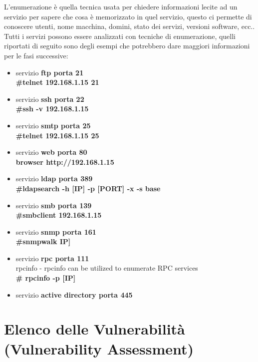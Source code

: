 \documentclass[a4paper,12pt]{article}
\begin{document}
L'enumerazione è quella tecnica usata per chiedere informazioni lecite ad un servizio per sapere che cosa è memorizzato in quel servizio, questo ci permette di conoscere utenti,  nome macchina, domini, stato dei servizi, versioni software, ecc.. \\
Tutti i servizi possono essere analizzati con tecniche di enumerazione, quelli riportati di seguito sono degli esempi che potrebbero dare maggiori informazioni per le fasi successive:
\begin{itemize}

    \item servizio\textbf{ ftp porta 21} \\
        \textbf{ \#telnet  192.168.1.15 21}
    \item servizio \textbf{ssh porta 22} \\
        \textbf{ \#ssh -v 192.168.1.15}
    \item servizio \textbf{smtp porta 25} \\
        \textbf{ \#telnet  192.168.1.15 25}
     \item servizio \textbf{web porta 80} \\
        \textbf{ browser http://192.168.1.15}
    \item servizio \textbf{ldap porta 389} \\
        \textbf{ \#ldapsearch -h [IP] -p [PORT] -x -s base}
    \item servizio\textbf{ smb porta 139} \\
        \textbf{ \#smbclient 192.168.1.15}
    \item servizio\textbf{ snmp porta 161} \\
         \textbf{ \#snmpwalk IP]}
     \item servizio\textbf{ rpc porta 111} \\
        rpcinfo - rpcinfo can be utilized to enumerate RPC services \\
        \textbf{ \# rpcinfo -p [IP]}
    \item servizio\textbf{ active directory porta 445}
\end{itemize}



\section{ Elenco delle Vulnerabilità (Vulnerability Assessment) }
\end{document}
